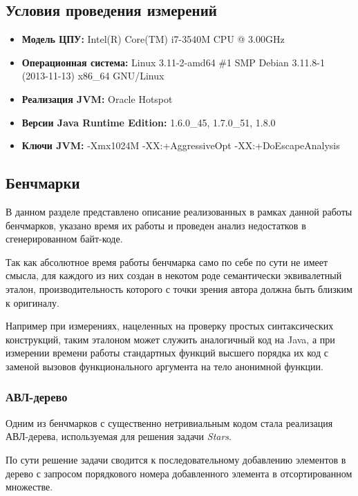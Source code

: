 \subsection{Условия проведения измерений}
\begin{itemize}
    \item \textbf{Модель ЦПУ:} Intel(R) Core(TM) i7-3540M CPU @ 3.00GHz
    \item \textbf{Операционная система:} Linux 3.11-2-amd64 \#1 SMP Debian 3.11.8-1 (2013-11-13) x86\_64 GNU/Linux
    \item \textbf{Реализация JVM:} Oracle Hotspot
    \item \textbf{Версии Java Runtime Edition:} 1.6.0\_45, 1.7.0\_51, 1.8.0
    \item \textbf{Ключи JVM:} -Xmx1024M -XX:+AggressiveOpt -XX:+DoEscapeAnalysis
\end{itemize}

\subsection{Бенчмарки}
\label{section:benchmarks}
В данном разделе представлено описание реализованных в рамках данной работы бенчмарков, указано
время их работы и проведен анализ недостатков в сгенерированном байт-коде.

Так как абсолютное время работы бенчмарка само по себе по сути не имеет смысла, для каждого из
них создан в некотом роде семантически эквивалетный эталон, производительность которого
с точки зрения автора должна быть близким к оригиналу.

Например при измерениях, нацеленных на проверку простых синтаксических конструкций, таким эталоном
может служить аналогичный код на Java, а при измерении времени работы стандартных функций высшего
порядка их код с заменой вызовов функционального аргумента на тело анонимной функции.

\subsubsection{АВЛ-дерево}
\label{section:avl:bm}
Одним из бенчмарков с существенно нетривиальным кодом стала реализация АВЛ-дерева, используемая
для решения задачи \textit{Stars}.

По сути решение задачи сводится к последовательному добавлению элементов в дерево с запросом
порядкового номера добавленного элемента в отсортированном множестве.

